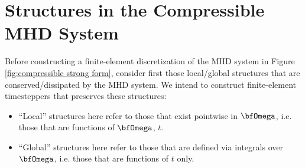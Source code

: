 \section{Structures in the Compressible MHD System}\label{cha:structures}
    Before constructing a finite-element discretization of the MHD system in Figure \ref{fig:compressible strong form}, consider first those local/global structures that are conserved/dissipated by the MHD system. We intend to construct finite-element timesteppers that preserves these structures:
    \begin{itemize}
        \item  ``Local'' structures here refer to those that exist pointwise in $\bfOmega$, i.e. those that are functions of $\bfOmega$, $t$.
        \item  ``Global'' structures here refer to those that are defined via integrals over $\bfOmega$, i.e. those that are functions of $t$ only.
    \end{itemize}



    
    
    